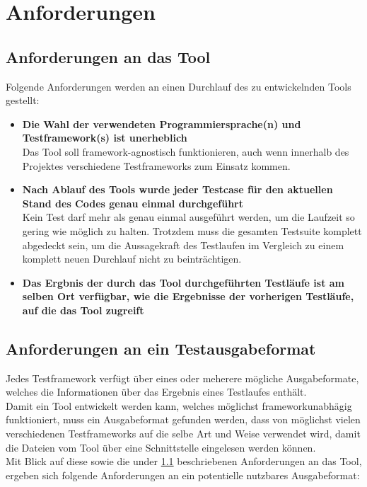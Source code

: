 \chapter{Anforderungen}\label{chap:Hintergrund}
% 
% 
\section{Anforderungen an das Tool}\label{Anforderungen Tool}
Folgende Anforderungen werden an einen Durchlauf des zu entwickelnden Tools gestellt:
\begin{itemize}
    \item \textbf{Die Wahl der verwendeten Programmiersprache(n) und Testframework(s) ist unerheblich}\\
    Das Tool soll framework-agnostisch funktionieren, auch wenn innerhalb des Projektes verschiedene Testframeworks zum Einsatz kommen.
    \item \textbf{Nach Ablauf des Tools wurde jeder Testcase für den aktuellen Stand des Codes genau einmal durchgeführt}\\
    Kein Test darf mehr als genau einmal ausgeführt werden, um die Laufzeit so gering wie möglich zu halten. Trotzdem muss die gesamten Testsuite komplett abgedeckt sein, um die Aussagekraft des Testlaufen im Vergleich zu einem komplett neuen Durchlauf nicht zu beinträchtigen.
    \item \textbf{Das Ergbnis der durch das Tool durchgeführten Testläufe ist am selben Ort verfügbar, wie die Ergebnisse der vorherigen Testläufe, auf die das Tool zugreift}
\end{itemize}

\section{Anforderungen an ein Testausgabeformat}\label{Anforderungen Testausgabeformat}
Jedes Testframework verfügt über eines oder meherere mögliche Ausgabeformate, welches die Informationen über das Ergebnis eines Testlaufes enthält.\\
Damit ein Tool entwickelt werden kann, welches möglichst frameworkunabhägig funktioniert, muss ein Ausgabeformat gefunden werden, dass von möglichst vielen verschiedenen Testframeworks auf die selbe Art und Weise verwendet wird, damit die Dateien vom Tool über eine Schnittstelle eingelesen werden können.\\
Mit Blick auf diese sowie die under \ref{Anforderungen Tool} beschriebenen Anforderungen an das Tool, ergeben sich folgende Anforderungen an ein potentielle nutzbares Ausgabeformat:


